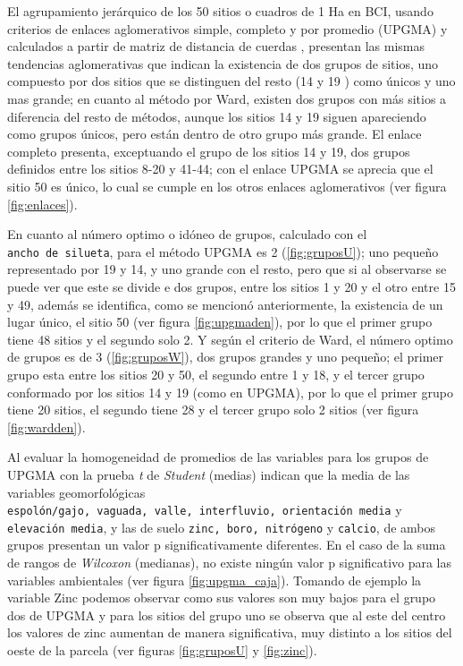 \documentclass[11pt,]{article}
\begin{document}
El agrupamiento jerárquico de los 50 sitios o cuadros de 1 Ha en BCI,
usando criterios de enlaces aglomerativos simple, completo y por
promedio (UPGMA) y calculados a partir de matriz de distancia de cuerdas
, presentan las mismas tendencias aglomerativas que indican la
existencia de dos grupos de sitios, uno compuesto por dos sitios que se
distinguen del resto (14 y 19 ) como únicos y uno mas grande; en cuanto
al método por Ward, existen dos grupos con más sitios a diferencia del
resto de métodos, aunque los sitios 14 y 19 siguen apareciendo como
grupos únicos, pero están dentro de otro grupo más grande. El enlace
completo presenta, exceptuando el grupo de los sitios 14 y 19, dos
grupos definidos entre los sitios 8-20 y 41-44; con el enlace UPGMA se
aprecia que el sitio 50 es único, lo cual se cumple en los otros enlaces
aglomerativos (ver figura \ref{fig:enlaces}).

En cuanto al número optimo o idóneo de grupos, calculado con el
\texttt{ancho\ de\ silueta}, para el método UPGMA es 2
(\ref{fig:gruposU}); uno pequeño representado por 19 y 14, y uno grande
con el resto, pero que si al observarse se puede ver que este se divide
e dos grupos, entre los sitios 1 y 20 y el otro entre 15 y 49, además se
identifica, como se mencionó anteriormente, la existencia de un lugar
único, el sitio 50 (ver figura \ref{fig:upgmaden}), por lo que el primer
grupo tiene 48 sitios y el segundo solo 2. Y según el criterio de Ward,
el número optimo de grupos es de 3 (\ref{fig:gruposW}), dos grupos
grandes y uno pequeño; el primer grupo esta entre los sitios 20 y 50, el
segundo entre 1 y 18, y el tercer grupo conformado por los sitios 14 y
19 (como en UPGMA), por lo que el primer grupo tiene 20 sitios, el
segundo tiene 28 y el tercer grupo solo 2 sitios (ver figura
\ref{fig:wardden}).

Al evaluar la homogeneidad de promedios de las variables para los grupos
de UPGMA con la prueba \emph{t} de \emph{Student} (medias) indican que
la media de las variables geomorfológicas
\texttt{espolón/gajo,\ vaguada,\ valle,\ interfluvio,\ orientación\ media}
y \texttt{elevación\ media}, y las de suelo
\texttt{zinc,\ boro,\ nitrógeno} y \texttt{calcio}, de ambos grupos
presentan un valor p significativamente diferentes. En el caso de la
suma de rangos de \emph{Wilcoxon} (medianas), no existe ningún valor p
significativo para las variables ambientales (ver figura
\ref{fig:upgma_caja}). Tomando de ejemplo la variable Zinc podemos
observar como sus valores son muy bajos para el grupo dos de UPGMA y
para los sitios del grupo uno se observa que al este del centro los
valores de zinc aumentan de manera significativa, muy distinto a los
sitios del oeste de la parcela (ver figuras \ref{fig:gruposU} y
\ref{fig:zinc}).
\end{document}
